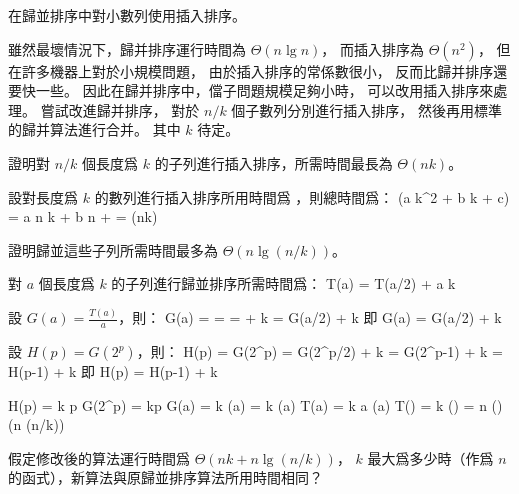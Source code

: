 \startsubject[
  title={Problems},
]
\startPROBLEM
在歸並排序中對小數列使用插入排序。

雖然最壞情況下，歸并排序運行時間為 $\Theta(n\lg n)$，
而插入排序為 $\Theta(n^2)$，
但在許多機器上對於小規模問題，
由於插入排序的常係數很小，
反而比歸并排序還要快一些。
因此在歸并排序中，儅子問題規模足夠小時，
可以改用插入排序來處理。
嘗試改進歸并排序，
對於 $n/k$ 個子數列分別進行插入排序，
然後再用標準的歸并算法進行合并。
其中 $k$ 待定。
\startigBase[a]

\item 證明對 $n/k$ 個長度爲 $k$ 的子列進行插入排序，所需時間最長為 $\Theta(nk)$。

\startANSWER
設對長度爲 $k$ 的數列進行插入排序所用時間爲 ，則總時間爲：
\startformula
{}(a k^2 + b k + c) = a n k + b n +  = \Theta(nk)
\stopformula
\stopANSWER

\item 證明歸並這些子列所需時間最多為 $\Theta(n \lg(n/k))$。

\startANSWER
對 $a$ 個長度爲 $k$ 的子列進行歸並排序所需時間爲：
\startformula
T(a) = \startcases
{}	\NC {} \NR
{} T(a/2) + a k \NC {} \NR
\stopcases
\stopformula

設 $G(a) = \frac{T(a)}{a}$，則：
\startformula\startalign
\NC G(a)	\NC =  \NR
\NC 		\NC =  \NR
\NC		\NC =  + k \NR
\NC		\NC = G(a/2) + k \NR
\stopalign\stopformula
即
\startformula
G(a) = \startcases
{}	\NC {}\NR
\NC G(a/2) + k \NC {} \NR
\stopcases
\stopformula

設 $H(p) = G(2^p)$，則：
\startsplitformula\startalign
\NC H(p)	\NC = G(2^p) \NR
\NC		\NC = G(2^p/2) + k \NR
\NC		\NC = G(2^{p-1}) + k \NR
\NC		\NC = H(p-1) + k \NR
\stopalign\stopsplitformula
即
\startformula
H(p) = \startcases
{}	\NC {} \NR
\NC H(p-1) + k \NC {} \NR
\stopcases
\stopformula

\startsplitformula\startalign
\NC H(p) \NC = k p \NR
\NC G(2^p) \NC = kp \NR
\NC G(a) \NC = k \lg(a) \NR
\NC {} \NC = k \lg(a) \NR
\NC T(a) \NC = k a \lg(a) \NR
\NC T() \NC = k  \lg() \NR
\NC		\NC = n \lg() \NR
\NC     \NC \Theta(n \lg(n/k)) \NR
\stopalign\stopsplitformula
\stopANSWER

\item 假定修改後的算法運行時間爲 $\Theta(nk+n \lg(n/k))$，
$k$ 最大爲多少時（作爲 $n$ 的函式），新算法與原歸並排序算法所用時間相同？

